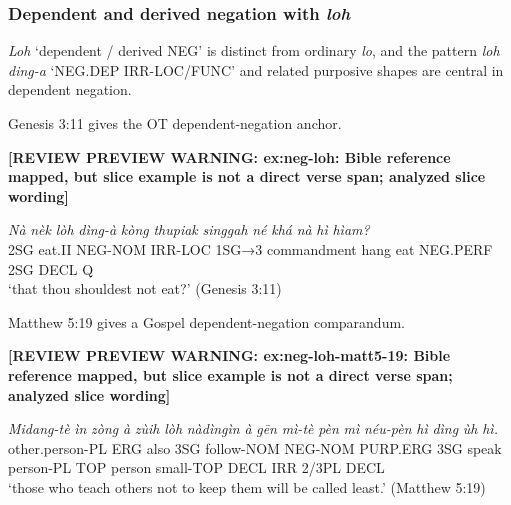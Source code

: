\documentclass[
  11pt,
  a4paper,
]{article}
\newcommand{\tdim}[1]{\textit{#1}}
\newcommand{\tdimword}[1]{\textit{#1}}
\renewcommand{\textsc}[1]{{\footnotesize\MakeUppercase{#1}}}
\newcommand{\glossquote}[1]{`#1'}
\newcommand{\reviewwarninginline}[1]{\textbf{#1}\par\smallskip}
\begin{document}
\subsubsection{\texorpdfstring{Dependent and derived negation with
\tdim{loh}}{Dependent and derived negation with }}\label{dependent-and-derived-negation-with}

\tdim{Loh} \glossquote{dependent / derived NEG} is distinct from
ordinary \tdim{lo}, and the pattern \tdim{loh ding-a}
\glossquote{NEG.DEP IRR-LOC/FUNC} and related purposive shapes are
central in dependent negation.

Genesis 3:11 gives the OT dependent-negation anchor.

\begin{exe}
\ex \label{ex:neg-loh}
\reviewwarninginline{[REVIEW PREVIEW WARNING: ex:neg-loh: Bible reference mapped, but slice example is not a direct verse span; analyzed slice wording]}
\gll \tdimword{Nà} \tdimword{nèk} \tdimword{lòh} \tdimword{dìng-à} \tdimword{kòng} \tdimword{thupiak} \tdimword{singgah} \tdimword{né} \tdimword{khá} \tdimword{nà} \tdimword{hì} \tdimword{hìam?} \\
     \textsc{2sg} eat.\textsc{ii} \textsc{neg}-\textsc{nom} \textsc{irr}-\textsc{loc} \textsc{1sg→3} commandment hang eat \textsc{neg}.\textsc{perf} \textsc{2sg} \textsc{decl} \textsc{q} \\
\glt \glossquote{that thou shouldest not eat?} (Genesis 3:11)
\end{exe}

Matthew 5:19 gives a Gospel dependent-negation comparandum.

\begin{exe}
\ex \label{ex:neg-loh-matt5-19}
\reviewwarninginline{[REVIEW PREVIEW WARNING: ex:neg-loh-matt5-19: Bible reference mapped, but slice example is not a direct verse span; analyzed slice wording]}
\gll \tdimword{Midang-tè} \tdimword{ìn} \tdimword{zòng} \tdimword{à} \tdimword{zùih} \tdimword{lòh} \tdimword{nàdìngìn} \tdimword{à} \tdimword{gēn} \tdimword{mì-tè} \tdimword{pèn} \tdimword{mì} \tdimword{néu-pèn} \tdimword{hì} \tdimword{dìng} \tdimword{ùh} \tdimword{hì.} \\
     other.person-\textsc{pl} \textsc{erg} also \textsc{3sg} follow-\textsc{nom} \textsc{neg}-\textsc{nom} \textsc{purp}.\textsc{erg} \textsc{3sg} speak person-\textsc{pl} \textsc{top} person small-\textsc{top} \textsc{decl} \textsc{irr} 2/3PL \textsc{decl} \\
\glt \glossquote{those who teach others not to keep them will be called least.} (Matthew 5:19)
\end{exe}
\end{document}
